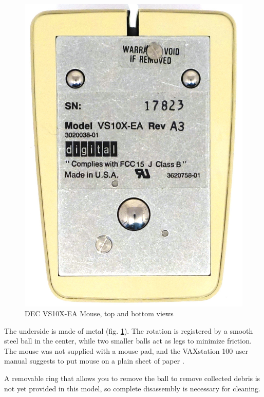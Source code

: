 \documentclass[11pt, a4paper]{article}
\begin{document}
\begin{figure}[h]
    \includegraphics[scale=0.55]{1983_dec_vs10x_ea_mouse/bottom_30.jpg}
    \caption{DEC VS10X-EA Mouse, top and bottom views}
    \label{fig:DecVS10XTopAndBottom}
\end{figure}

The underside is made of metal (fig. \ref{fig:DecVS10XTopAndBottom}). The rotation is registered by a smooth steel ball in the center, while two smaller balls act as legs to minimize friction. The mouse was not supplied with a mouse pad, and  the VAXstation 100 user manual suggests to  put mouse on a plain sheet of paper \cite{manual}.

A removable ring that allows you to remove the ball to remove collected debris is not yet provided in this model, so complete disassembly is necessary for cleaning.
\end{document}
